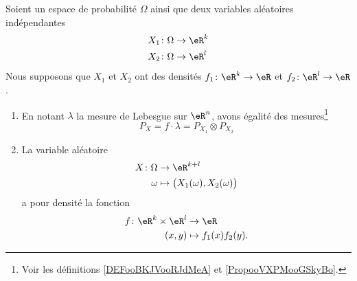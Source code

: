 \begin{proposition}	\label{PROPooCXSWooByucuN}
	Soient un espace de probabilité \( \Omega\) ainsi que deux variables aléatoires indépendantes
	\begin{subequations}
		\begin{align}
			X_1 & \colon \Omega\to \eR^k \\
			X_2 & \colon \Omega\to \eR^l
		\end{align}
	\end{subequations}
	Nous supposons que \( X_1\) et \( X_2\) ont des densités \(f_1 \colon \eR^k\to \eR  \) et \(f_2 \colon \eR^l\to \eR  \).

	\begin{enumerate}
		\item
		      En notant \( \lambda\) la mesure de Lebesgue sur \( \eR^n\), avons égalité des mesures\footnote{Voir les définitions \ref{DEFooBKJVooRJdMeA} et \ref{PropooVXPMooGSkyBo}.}
		      \begin{equation}
			      P_X=f\cdot \lambda=P_{X_1}\otimes P_{X_2}
		      \end{equation}

		\item

		      La variable aléatoire
		      \begin{equation}
			      \begin{aligned}
				      X\colon \Omega & \to \eR^{k+l}                               \\
				      \omega         & \mapsto \big( X_1(\omega),X_2(\omega) \big)
			      \end{aligned}
		      \end{equation}
		      a pour densité la fonction
		      \begin{equation}
			      \begin{aligned}
				      f\colon \eR^k\times \eR^l & \to \eR               \\
				      (x,y)                     & \mapsto f_1(x)f_2(y).
			      \end{aligned}
		      \end{equation}
	\end{enumerate}
\end{proposition}

